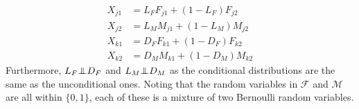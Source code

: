 \documentclass{article}
\newcommand{\indep}{\bot\hspace{-.6em}\bot}
\begin{document}
\begin{align*}
  X_{j1} & =  L_F F_{j1} + (1 - L_F) F_{j2} \\ %
  X_{j2} & =  L_M M_{j1} + (1 - L_M) M_{j2} \\ %
  X_{k1} & =  D_F F_{k1} + (1 - D_F) F_{k2} \\ %
  X_{k2} & =  D_M M_{k1} + (1 - D_M) M_{k2} %
\end{align*}
Furthermore, $L_F \indep D_F$ and $L_M \indep D_M$ as the conditional distributions are the same as the unconditional ones. Noting that the random variables in $\mathcal{F}$ and $\mathcal{M}$ are all within $\{0,1\}$, each of these is a mixture of two Bernoulli random variables.
\end{document}
